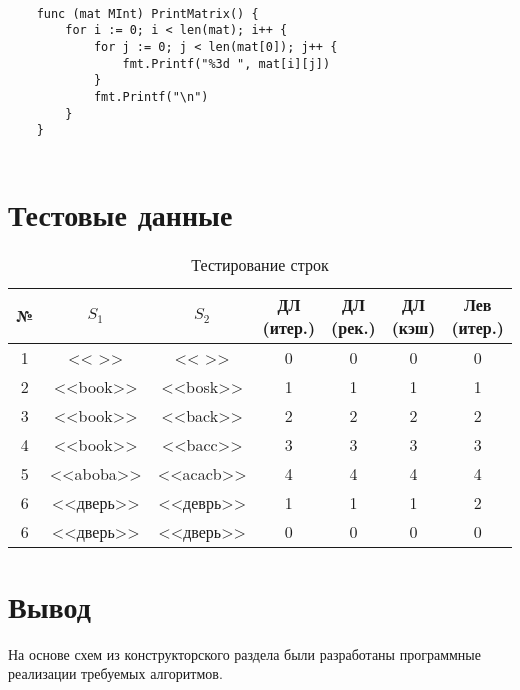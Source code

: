 \begin{lstlisting}[label=out-matrix,caption=Вывод матрицы расстояний]
	
	func (mat MInt) PrintMatrix() {
		for i := 0; i < len(mat); i++ {
			for j := 0; j < len(mat[0]); j++ {
				fmt.Printf("%3d ", mat[i][j])
			}
			fmt.Printf("\n")
		}
	}
	
\end{lstlisting}


\section{Тестовые данные}

\begin{table}[ht!]
	\begin{center}
		\caption{Тестирование строк}
		\begin{tabular}{||c c c | c c c c||} 
			\hline
			№ & $S_1$ & $S_2$ & ДЛ (итер.) & ДЛ (рек.) & ДЛ (кэш) & Лев (итер.)\\
			[0.5ex] 
			\hline\hline
			1 & << >> & << >> & 0 & 0 & 0 & 0 \\
			2 & <<book>> & <<bosk>> & 1 & 1 & 1 & 1 \\ 
			3 & <<book>> & <<back>> & 2 & 2 & 2 & 2 \\ 
			4 & <<book>> & <<bacc>> & 3 & 3 & 3 & 3 \\ 
			5 & <<aboba>> & <<acacb>> & 4 & 4 & 4 & 4 \\ 
			6 & <<дверь>> & <<деврь>> & 1 & 1 & 1 & 2 \\   
			6 & <<дверь>> & <<дверь>> & 0 & 0 & 0 & 0\\   
			\hline
		\end{tabular}
	\label{table:4}
	\end{center}

\end{table}



\section{Вывод}
На основе схем из конструкторского раздела были разработаны программные реализации требуемых алгоритмов.